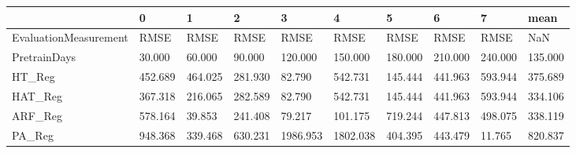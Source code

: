 \begin{tabular}{llllllllll}
\toprule
{} &       0 &       1 &       2 &        3 &        4 &       5 &       6 &       7 &    mean \\
\midrule
EvaluationMeasurement &    RMSE &    RMSE &    RMSE &     RMSE &     RMSE &    RMSE &    RMSE &    RMSE &     NaN \\
PretrainDays          &  30.000 &  60.000 &  90.000 &  120.000 &  150.000 & 180.000 & 210.000 & 240.000 & 135.000 \\
HT\_Reg                & 452.689 & 464.025 & 281.930 &   82.790 &  542.731 & 145.444 & 441.963 & 593.944 & 375.689 \\
HAT\_Reg               & 367.318 & 216.065 & 282.589 &   82.790 &  542.731 & 145.444 & 441.963 & 593.944 & 334.106 \\
ARF\_Reg               & 578.164 &  39.853 & 241.408 &   79.217 &  101.175 & 719.244 & 447.813 & 498.075 & 338.119 \\
PA\_Reg                & 948.368 & 339.468 & 630.231 & 1986.953 & 1802.038 & 404.395 & 443.479 &  11.765 & 820.837 \\
\bottomrule
\end{tabular}

